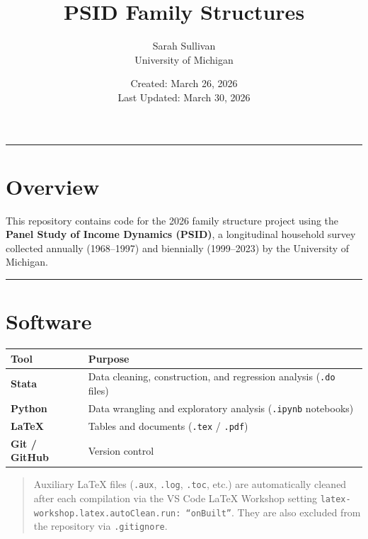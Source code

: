 \documentclass[12pt]{article}
\title{PSID Family Structures}
\author{Sarah Sullivan \\ University of Michigan}
\date{Created: March 26, 2026 \\ Last Updated: March 30, 2026}
\begin{document}
\maketitle

\noindent\rule{\textwidth}{0.4pt}

\section*{Overview}

This repository contains code for the 2026 family structure project using the \textbf{Panel Study of Income Dynamics (PSID)}, a longitudinal household survey collected annually (1968--1997) and biennially (1999--2023) by the University of Michigan.

\noindent\rule{\textwidth}{0.4pt}

\section*{Software}

\begin{center}
\begin{tabular}{ll}
\toprule
\textbf{Tool} & \textbf{Purpose} \\
\midrule
\textbf{Stata}        & Data cleaning, construction, and regression analysis (\texttt{.do} files) \\
\textbf{Python}       & Data wrangling and exploratory analysis (\texttt{.ipynb} notebooks) \\
\textbf{\LaTeX}       & Tables and documents (\texttt{.tex} / \texttt{.pdf}) \\
\textbf{Git / GitHub} & Version control \\
\bottomrule
\end{tabular}
\end{center}

\begin{quote}
Auxiliary \LaTeX{} files (\texttt{.aux}, \texttt{.log}, \texttt{.toc}, etc.) are automatically cleaned after each compilation via the VS Code LaTeX Workshop setting \texttt{latex-workshop.latex.autoClean.run: ``onBuilt''}. They are also excluded from the repository via \texttt{.gitignore}.
\end{quote}
\end{document}
